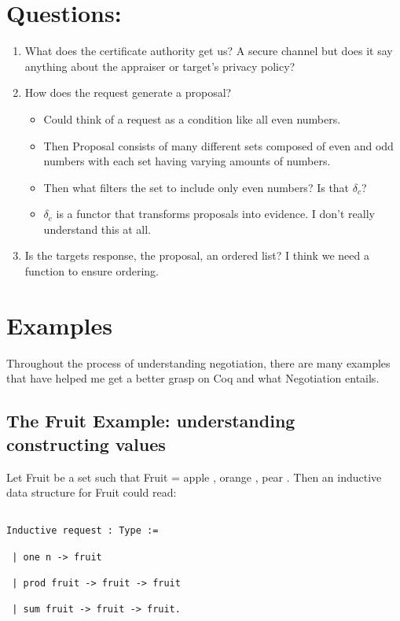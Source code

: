 \documentclass[10pt]{article}
\begin{document}
\section {Questions:}
\begin{enumerate}
  \item What does the certificate authority get us? A secure channel but 
        does it say anything about the appraiser or target's
        privacy policy?
  \item How does the request generate a proposal? 
  \begin{itemize}
    \item Could think of a request as a condition like all even numbers.
    \item Then Proposal consists of many different sets composed of even
          and odd numbers with each set having varying amounts of numbers.
    \item Then what filters the set to include only even numbers?
          Is that $\delta_c$?
    \item $\delta_c$ is a functor that transforms proposals into evidence.
          I don't really understand this at all.  
  \end{itemize}
  \item Is the targets response, the proposal, an ordered list?
        I think we need a function to ensure ordering.
\end{enumerate}

\section {Examples}

Throughout the process of understanding negotiation, there are many examples that have helped me get a better grasp on Coq and what Negotiation entails. 

\subsection {The Fruit Example: understanding constructing values}

Let Fruit be a set such that Fruit = { apple , orange , pear }. Then an inductive data structure for Fruit could read:  

\begin{verbatim}

Inductive request : Type := 
 
 | one n -> fruit

 | prod fruit -> fruit -> fruit

 | sum fruit -> fruit -> fruit.
\end{verbatim}
\end{document}

